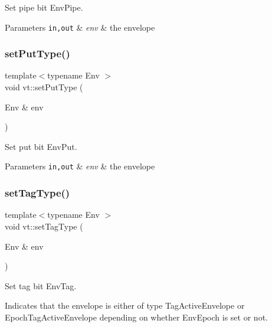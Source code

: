 Set pipe bit {\ttfamily Env\+Pipe}. 


\begin{DoxyParams}[1]{Parameters}
\mbox{\tt in,out}  & {\em env} & the envelope \\
\hline
\end{DoxyParams}
\mbox{\label{namespacevt_ab25ac0a12270d261c2f5c3c634f6370e}} 
\subsubsection{\texorpdfstring{set\+Put\+Type()}{setPutType()}}
{\footnotesize\ttfamily template$<$typename Env $>$ \\
void vt\+::set\+Put\+Type (\begin{DoxyParamCaption}\item[{Env \&}]{env }\end{DoxyParamCaption})\hspace{0.3cm}{\ttfamily [inline]}}



Set put bit {\ttfamily Env\+Put}. 


\begin{DoxyParams}[1]{Parameters}
\mbox{\tt in,out}  & {\em env} & the envelope \\
\hline
\end{DoxyParams}
\mbox{\label{namespacevt_ad088db89648b82eef7ca9b4837a907cd}} 
\subsubsection{\texorpdfstring{set\+Tag\+Type()}{setTagType()}}
{\footnotesize\ttfamily template$<$typename Env $>$ \\
void vt\+::set\+Tag\+Type (\begin{DoxyParamCaption}\item[{Env \&}]{env }\end{DoxyParamCaption})\hspace{0.3cm}{\ttfamily [inline]}}



Set tag bit {\ttfamily Env\+Tag}. 

Indicates that the envelope is either of type {\ttfamily Tag\+Active\+Envelope} or {\ttfamily Epoch\+Tag\+Active\+Envelope} depending on whether {\ttfamily Env\+Epoch} is set or not.


